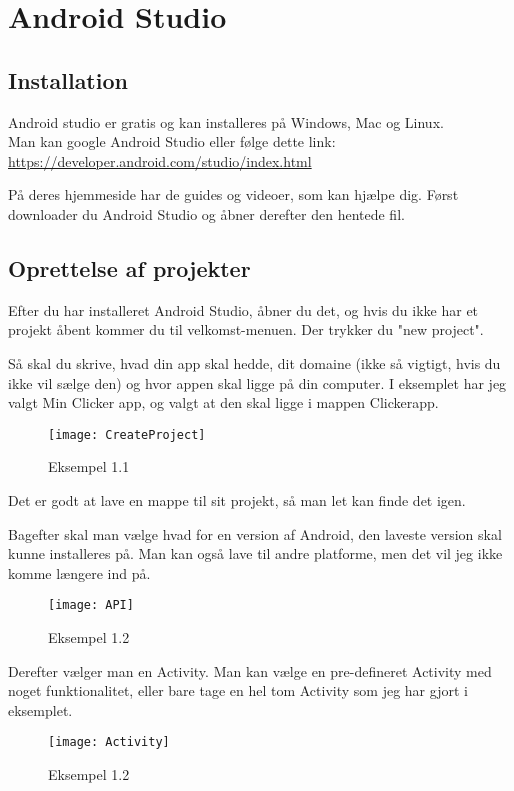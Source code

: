 \chapter{Android Studio}

\section{Installation}
Android studio er gratis og kan installeres på Windows, Mac og Linux.\\
Man kan google Android Studio eller følge dette link:\\
\url{https://developer.android.com/studio/index.html}

På deres hjemmeside har de guides og videoer, som kan hjælpe dig.
Først downloader du Android Studio og åbner derefter den hentede fil.

\section{Oprettelse af projekter}
Efter du har installeret Android Studio, åbner du det, og hvis du ikke har et projekt åbent kommer du til velkomst-menuen. Der trykker du "new project".

Så skal du skrive, hvad din app skal hedde, dit domaine (ikke så vigtigt, hvis du ikke vil sælge den) og hvor appen skal ligge på din computer. I eksemplet har jeg valgt Min Clicker app, og valgt at den skal ligge i mappen Clickerapp. 
\begin{figure}[h]
	\texttt{[image: CreateProject]}
	\caption{Eksempel 1.1}
	\label{fig:createproject}
\end{figure}
Det er godt at lave en mappe til sit projekt, så man let kan finde det igen. 

Bagefter skal man vælge hvad for en version af Android, den laveste version skal kunne installeres på. Man kan også lave til andre platforme, men det vil jeg ikke komme længere ind på. 
\begin{figure}[h]
	\texttt{[image: API]}
	\caption{Eksempel 1.2}
	\label{fig:API}
\end{figure}

Derefter vælger man en Activity.
Man kan vælge en pre-defineret Activity med noget funktionalitet, eller bare tage en hel tom Activity som jeg har gjort i eksemplet.

\begin{figure}[h]
	\texttt{[image: Activity]}
	\caption{Eksempel 1.2}
	\label{fig:Activiy}
\end{figure}

